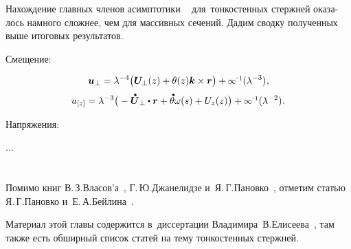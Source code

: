 \begin{otherlanguage}{russian}

Нахождение главных членов асимптотики
~
для~тонкостенных стержней
оказалось
намного сложнее,
чем для массивных сечений.
Дадим сводку полученных выше итоговых результатов.

Смещение:

\begin{equation}
\withtheindexofperpendicularity{\fieldofdisplacements}
=
\lambda^{-4}
\bigl(
   \withtheindexofperpendicularity{\bm{U}} (z)
   +
   \theta (z) \bm{k} \times \bm{r}
\bigr)
+
\hspace{-0.1ex} \scalebox{.9}{$
   \infty^{\hspace{-0.4ex}\expminusone}
$}(\lambda^{-3})
\hspace{.1ex} ,
\end{equation}
%
\begin{equation}
\fieldofdisplacementscomponents{z}
=
\lambda^{-3}
\bigl(
   {}- \withtheindexofperpendicularity{\mathdotabove{\bm{U}}}
   \dotp
   \bm{r}
   +
   \mathdotabove{\theta}
   \omega (s)
   +
   U_z (z)
\bigr)
+
\hspace{-0.1ex} \scalebox{.9}{$
   \infty^{\hspace{-0.4ex}\expminusone}
$}(\lambda^{-2})
\hspace{.1ex} .
\end{equation}

Напряжения:

...


\end{otherlanguage}

\vspace{8mm}
\hfill\begin{minipage}[b]{0.95\linewidth}
\fontsize{10}{12}\selectfont

\section*{\wordforbibliography}

\begin{otherlanguage}{russian}

Помимо книг
В.\,З.\;Власов’а~\cite{vlasov-thinwalledrods},
Г.\,Ю.\;Джанелидзе и~Я.\,Г.\;Пановко~\cite{janelidzepanovko-thinwalledrods},
отметим
статью
Я.\,Г.\;Пановко и~Е.\,А.\;Бейлина~\cite{panovko.beylin-thinwalledrods}.

Материал этой главы содержится
в~диссертации
Владимира~В.\;Елисеева~\cite{eliseev-models},
там также есть обширный список статей
на тему
тонкостенных стержней.

\end{otherlanguage}

\end{minipage}

